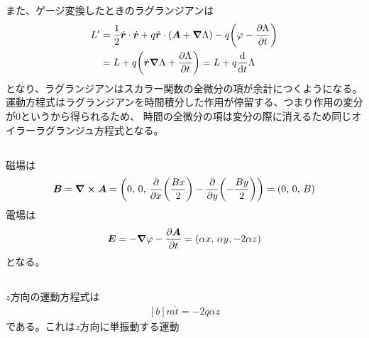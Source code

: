 \documentclass[../../master.tex]{subfiles}
\begin{document}
また、ゲージ変換したときのラグランジアンは
\begin{align*}
    L' &= \frac{1}{2}\dot{\vb*{r}}\cdot\dot{\vb*{r}} + q\dot{\vb*{r}}\cdot\qty(\vb*{A}+\grad{\Lambda})- q\qty(\varphi-\pdv{\Lambda}{t})\\
    &= L + q\qty(\dot{\vb*{r}}\grad{\Lambda}+\pdv{\Lambda}{t}) = L + q\dv{t}\Lambda
\end{align*}
となり、ラグランジアンはスカラー関数の全微分の項が余計につくようになる。
運動方程式はラグランジアンを時間積分した作用が停留する、つまり作用の変分が0というから得られるため、
時間の全微分の項は変分の際に消えるため同じオイラーラグランジュ方程式となる。

\subsection{}
磁場は
\begin{equation}\begin{aligned}[b]
    \vb*{B} = \curl{\vb*{A}} = \qty(0,\,0,\,\pdv{x}\qty(\frac{Bx}{2})-\pdv{y}\qty(-\frac{By}{2})) = \qty(0,\,0,\,B)
\end{aligned}\end{equation}
電場は
\begin{equation}\begin{aligned}[b]
    \vb*{E} = -\grad{\varphi} - \pdv{\vb*{A}}{t} = \qty(\alpha x,\,\alpha y, -2\alpha z)
\end{aligned}\end{equation}
となる。

\subsection{}
\(z\)方向の運動方程式は
\begin{equation}\begin{aligned}[b]
    m\ddot{t} = -2q\alpha z
\end{aligned}\end{equation}
である。これは\(z\)方向に単振動する運動
\end{document}
